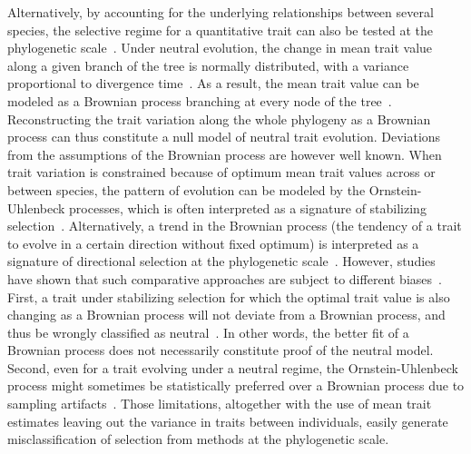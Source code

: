 \documentclass{article}
\begin{document}
Alternatively, by accounting for the underlying relationships between several species, the selective regime for a quantitative trait can also be tested at the phylogenetic scale~\parencite{felsenstein_phylogenies_1985}.
Under neutral evolution, the change in mean trait value along a given branch of the tree is normally distributed, with a variance proportional to divergence time~\parencite{hansen_translating_1996}.
As a result, the mean trait value can be modeled as a Brownian process branching at every node of the tree~\parencite{hansen_translating_1996, harmon_phylogenetic_2018}.
Reconstructing the trait variation along the whole phylogeny as a Brownian process can thus constitute a null model of neutral trait evolution.
Deviations from the assumptions of the Brownian process are however well known.
When trait variation is constrained because of optimum mean trait values across or between species, the pattern of evolution can be modeled by the Ornstein-Uhlenbeck processes, which is often interpreted as a signature of stabilizing selection~\parencite{catalan_drift_2019}.
Alternatively, a trend in the Brownian process (the tendency of a trait to evolve in a certain direction without fixed optimum) is interpreted as a signature of directional selection at the phylogenetic scale~\parencite{silvestro_early_2019}.
However, studies have shown that such comparative approaches are subject to different biases~\parencite{harmon_phylogenetic_2018}.
First, a trait under stabilizing selection for which the optimal trait value is also changing as a Brownian process will not deviate from a Brownian process, and thus be wrongly classified as neutral~\parencite{hansen_translating_1996}.
In other words, the better fit of a Brownian process does not necessarily constitute proof of the neutral model.
Second, even for a trait evolving under a neutral regime, the Ornstein-Uhlenbeck process might sometimes be statistically preferred over a Brownian process due to sampling artifacts~\parencite{silvestro_measurement_2015, cooper_cautionary_2016, price_detecting_2022}.
Those limitations, altogether with the use of mean trait estimates leaving out the variance in traits between individuals, easily generate misclassification of selection from methods at the phylogenetic scale.
\end{document}
